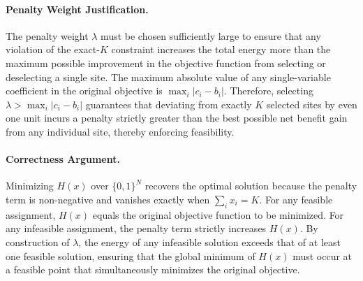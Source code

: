 \documentclass[12pt]{article}
\begin{document}
\paragraph{Penalty Weight Justification.}
The penalty weight $\lambda$ must be chosen sufficiently large to ensure that any violation of the exact-$K$ constraint increases the total energy more than the maximum possible improvement in the objective function from selecting or deselecting a single site. The maximum absolute value of any single-variable coefficient in the original objective is $\max_{i} |c_i - b_i|$. Therefore, selecting $\lambda > \max_{i} |c_i - b_i|$ guarantees that deviating from exactly $K$ selected sites by even one unit incurs a penalty strictly greater than the best possible net benefit gain from any individual site, thereby enforcing feasibility.

\paragraph{Correctness Argument.}
Minimizing $H(x)$ over $\{0, 1\}^N$ recovers the optimal solution because the penalty term is non-negative and vanishes exactly when $\sum_{i} x_i = K$. For any feasible assignment, $H(x)$ equals the original objective function to be minimized. For any infeasible assignment, the penalty term strictly increases $H(x)$. By construction of $\lambda$, the energy of any infeasible solution exceeds that of at least one feasible solution, ensuring that the global minimum of $H(x)$ must occur at a feasible point that simultaneously minimizes the original objective.
\end{document}
